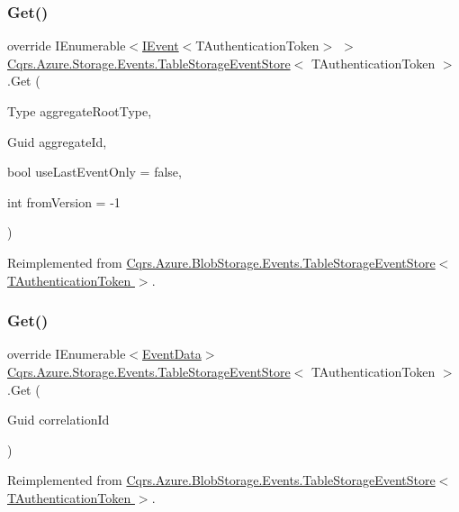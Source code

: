 \subsubsection{\texorpdfstring{Get()}{Get()}\hspace{0.1cm}{\footnotesize\ttfamily [1/2]}}
{\footnotesize\ttfamily override I\+Enumerable$<$\hyperlink{interfaceCqrs_1_1Events_1_1IEvent}{I\+Event}$<$T\+Authentication\+Token$>$ $>$ \hyperlink{classCqrs_1_1Azure_1_1Storage_1_1Events_1_1TableStorageEventStore}{Cqrs.\+Azure.\+Storage.\+Events.\+Table\+Storage\+Event\+Store}$<$ T\+Authentication\+Token $>$.Get (\begin{DoxyParamCaption}\item[{Type}]{aggregate\+Root\+Type,  }\item[{Guid}]{aggregate\+Id,  }\item[{bool}]{use\+Last\+Event\+Only = {\ttfamily false},  }\item[{int}]{from\+Version = {\ttfamily -\/1} }\end{DoxyParamCaption})\hspace{0.3cm}{\ttfamily [virtual]}}



Reimplemented from \hyperlink{classCqrs_1_1Azure_1_1BlobStorage_1_1Events_1_1TableStorageEventStore_a420c94c86d8d1c2959aee8602f43c0c0}{Cqrs.\+Azure.\+Blob\+Storage.\+Events.\+Table\+Storage\+Event\+Store$<$ T\+Authentication\+Token $>$}.

\mbox{\label{classCqrs_1_1Azure_1_1Storage_1_1Events_1_1TableStorageEventStore_a1b436bbb111b14b85ee6ba7f90fb1a35}} 
\subsubsection{\texorpdfstring{Get()}{Get()}\hspace{0.1cm}{\footnotesize\ttfamily [2/2]}}
{\footnotesize\ttfamily override I\+Enumerable$<$\hyperlink{classCqrs_1_1Events_1_1EventData}{Event\+Data}$>$ \hyperlink{classCqrs_1_1Azure_1_1Storage_1_1Events_1_1TableStorageEventStore}{Cqrs.\+Azure.\+Storage.\+Events.\+Table\+Storage\+Event\+Store}$<$ T\+Authentication\+Token $>$.Get (\begin{DoxyParamCaption}\item[{Guid}]{correlation\+Id }\end{DoxyParamCaption})\hspace{0.3cm}{\ttfamily [virtual]}}



Reimplemented from \hyperlink{classCqrs_1_1Azure_1_1BlobStorage_1_1Events_1_1TableStorageEventStore_a9b952a9257dc6f458b98eba87684412e}{Cqrs.\+Azure.\+Blob\+Storage.\+Events.\+Table\+Storage\+Event\+Store$<$ T\+Authentication\+Token $>$}.

